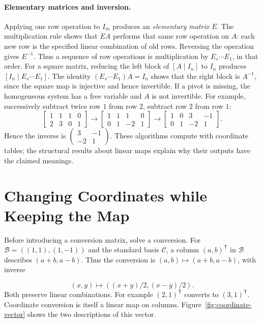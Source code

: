 \paragraph{Elementary matrices and inversion.}
Applying one row operation to $I_m$ produces an \emph{elementary matrix}
$E$. The multiplication rule shows that $EA$ performs that same row
operation on $A$: each new row is the specified linear combination of
old rows. Reversing the operation gives $E^{-1}$. Thus a sequence of
row operations is multiplication by $E_s\cdots E_1$, in that order.
For a square matrix, reducing the left block of $[A\mid I_n]$ to $I_n$
produces $[I_n\mid E_s\cdots E_1]$. The identity
$(E_s\cdots E_1)A=I_n$ shows that the right block is $A^{-1}$, since
the square map is injective and hence invertible. If a pivot is missing,
the homogeneous system has a free variable and $A$ is not invertible.
For example, successively subtract twice row $1$ from row $2$, subtract
row $2$ from row $1$:
\[
\left[\begin{array}{cc|cc}1&1&1&0\\2&3&0&1\end{array}\right]
\longrightarrow
\left[\begin{array}{cc|cc}1&1&1&0\\0&1&-2&1\end{array}\right]
\longrightarrow
\left[\begin{array}{cc|cc}1&0&3&-1\\0&1&-2&1\end{array}\right].
\]
Hence the inverse is $\left(\begin{smallmatrix}3&-1\\-2&1\end{smallmatrix}\right)$.
These algorithms compute with coordinate tables; the structural results
about linear maps explain why their outputs have the claimed meanings.

\section{Changing Coordinates while Keeping the Map}
Before introducing a conversion matrix, solve a conversion. For
$\mathcal B=((1,1),(1,-1))$ and the standard basis $\mathcal C$,
a column $(a,b)^{\mathsf T}$ in $\mathcal B$ describes $(a+b,a-b)$.
Thus the conversion is $(a,b)\mapsto(a+b,a-b)$, with inverse

\[
(x,y)\mapsto((x+y)/2,(x-y)/2).
\]
 Both preserve linear combinations.
For example $(2,1)^{\mathsf T}$ converts to $(3,1)^{\mathsf T}$.
Coordinate conversion is itself a linear map on columns.
Figure~\ref{fig:coordinate-vector} shows the two descriptions of this vector.

\FloatBarrier

